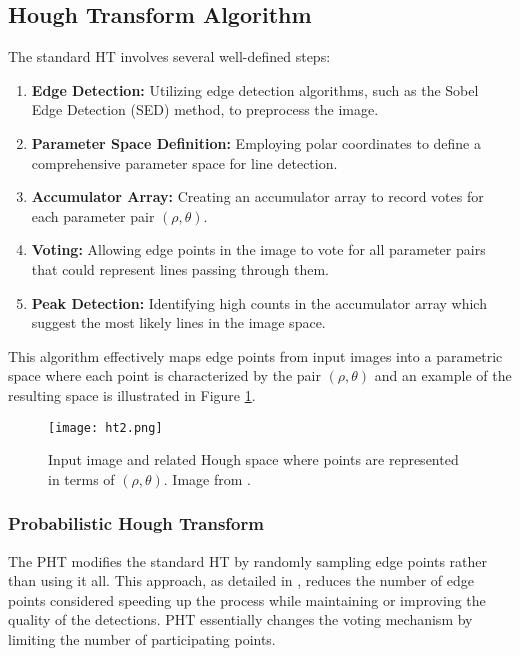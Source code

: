 \documentclass[conference]{IEEEtran}
\begin{document}
    \subsection{Hough Transform Algorithm}
    \label{sec:sht_algorithm}
        The standard HT involves several well-defined steps:
        \begin{enumerate}
            \item \textbf{Edge Detection:} Utilizing edge detection algorithms, such as the Sobel Edge Detection (SED) method, to preprocess the image.
            \item \textbf{Parameter Space Definition:} Employing polar coordinates to define a comprehensive parameter space for line detection.
            \item \textbf{Accumulator Array:} Creating an accumulator array to record votes for each parameter pair $(\rho, \theta)$.
            \item \textbf{Voting:} Allowing edge points in the image to vote for all parameter pairs that could represent lines passing through them.
            \item \textbf{Peak Detection:} Identifying high counts in the accumulator array which suggest the most likely lines in the image space.
        \end{enumerate}

        This algorithm effectively maps edge points from input images into a parametric space where each point is characterized by the pair $(\rho, \theta)$ and an example of the resulting space is illustrated in Figure \ref{fig:ht2}.
        
        \begin{figure}[htbp]
            \centering
            \texttt{[image: ht2.png]}
            \caption{Input image and related Hough space where points are represented in terms of $(\rho, \theta)$. Image from \cite{enwiki:1226870376}.}
            \label{fig:ht2}
        \end{figure}

    \subsubsection{Probabilistic Hough Transform}
    \label{sec:pht}
        The PHT modifies the standard HT by randomly sampling edge points rather than using it all. This approach, as detailed in \cite{PHT}, reduces the number of edge points considered speeding up the process while maintaining or improving the quality of the detections. PHT essentially changes the voting mechanism by limiting the number of participating points.
        
\end{document}
